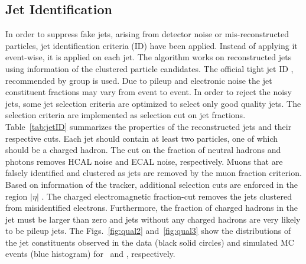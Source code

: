 \subsection{Jet Identification}
In order to suppress fake jets, arising from detector noise or mis-reconstructed particles, jet identification criteria (ID) have been applied. Instead of applying it event-wise, it is applied on each jet. The algorithm works on reconstructed jets using information of the clustered particle candidates. The official tight jet ID \cite{CMS:2010xta}, recommended by \JetMet group \cite{JetID} is used. Due to pileup and electronic noise the jet constituent fractions may vary from event to event. In order to reject the noisy jets, some jet selection criteria are optimized to select only good quality jets. The selection criteria are implemented as selection cut on jet fractions. Table~\ref{tab:jetID} summarizes the properties of the reconstructed jets and their respective cuts. Each jet should contain at least two particles, one of which should be a charged hadron. The cut on the fraction of neutral hadrons and photons removes HCAL noise and ECAL noise, respectively. Muons that are falsely identified and clustered as jets are removed by the muon fraction criterion. Based on information of the tracker, additional selection cuts are enforced in the region $|\eta|$ . The charged electromagnetic fraction-cut removes the jets clustered from misidentified electrons. Furthermore, the fraction of charged hadrons in the jet must be larger than zero and jets without any charged hadrons are very likely to be pileup jets. The Figs.~\ref{fig:qual2} and~\ref{fig:qual3} show the distributions of the jet constituents observed in the data (black solid circles) and simulated MC events (blue histogram) for \njt~and \njth, respectively.

